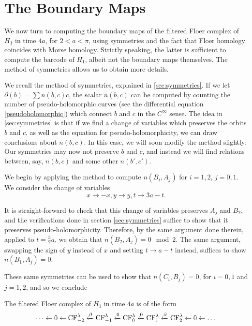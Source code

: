 \section{The Boundary Maps}

We now turn to computing the boundary maps of the filtered Floer complex of $H_1$ in time $4a$, for $2 < a < \pi$, using symmetries and the fact that Floer homology coincides with Morse homology. Strictly speaking, the latter is sufficient to compute the barcode of $H_1$, albeit not the boundary maps themselves. The method of symmetries allows us to obtain more details.

We recall the method of symmetries, explained in \ref{sec:symmetries}. If we let $\partial(b) = \sum n(b,c) c$, the scalar $n(b,c)$ can be computed by counting the number of pseudo-holomorphic curves (see the differential equation \eqref{pseudoholomorphic}) which connect $b$ and $c$ in the $C^\infty$ sense. The idea in \ref{sec:symmetries} is that if we find a change of variables which preserves the orbits $b$ and $c$, as well as the equation for pseudo-holomorphicity, we can draw conclusions about $n(b,c)$. In this case, we will soon modify the method slightly: Our symmetries may now not preserve $b$ and $c$, and instead we will find relations between, say, $n(b,c)$ and some other $n(b', c')$.

We begin by applying the method to compute $n(B_i, A_j)$ for $i = 1, 2$, $j = 0, 1$. We consider the change of variables
\begin{equation}
x \to -x, y \to y, t \to 3a - t.
\end{equation}

It is straight-forward to check that this change of variables preserves $A_j$ and $B_2$, and the verifications done in section \ref{sec:symmetries} suffice to show that it preserves pseudo-holomorphicity. Therefore, by the same argument done therein, applied to $t = \frac32 a$, we obtain that $n(B_2, A_j) = 0 \mod 2$. The same argument, swapping the sign of $y$ instead of $x$ and setting $t \to a - t$ instead, suffices to show $n(B_1, A_j) = 0$.

These same symmetries can be used to show that $n(C_i, B_j) = 0$, for $i = 0, 1$ and $j = 1, 2$, and so we conclude
\begin{prop}\label{fch14a1}
The filtered Floer complex of $H_1$ in time $4a$ is of the form
\begin{equation}
\dots \leftarrow 0 \leftarrow \mathrm{CF}_{-2}^\lambda \xleftarrow{\partial} \mathrm{CF}_{-1}^\lambda \xleftarrow{0} \mathrm{CF}_0^\lambda \xleftarrow{0} \mathrm{CF}_1^\lambda \xleftarrow{\partial} \mathrm{CF}_2^\lambda \leftarrow 0 \leftarrow \dots
\end{equation}
\end{prop}

